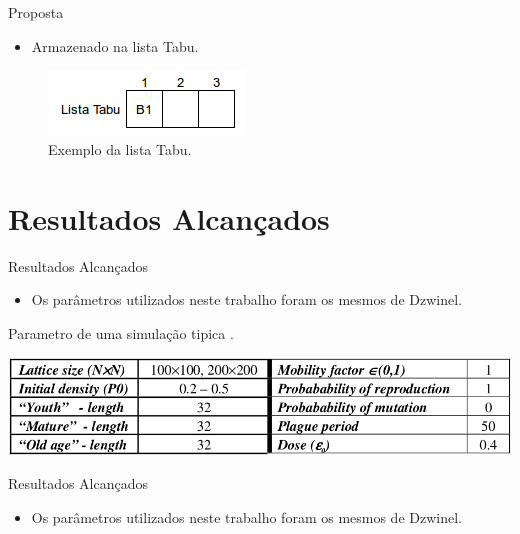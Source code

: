 \documentclass{beamer}
\begin{document}
\begin{frame}{Proposta}
	\begin{itemize}
		\item Armazenado na lista Tabu.
	\end{itemize}
\begin{figure}[h!]
\centering
\includegraphics[width=.5\textwidth]{../artigo/imagens/lista-tabu}
\caption{Exemplo da lista Tabu.}
\label{fig:busca-tabu}
\end{figure}
\end{frame}

\section{Resultados Alcançados}
\begin{frame}{Resultados Alcançados}
	\begin{itemize}
		\item Os parâmetros utilizados neste trabalho foram os mesmos de
		Dzwinel.
	\end{itemize}
\begin{table}[ht]
\centering
\caption{Parametro de uma simulação tipica \cite{dzwinel:04}.}
\label{tab:parametro-simulacao}
\includegraphics[width=.7\textwidth]{../artigo/imagens/parametro-simulacao}
\end{table}
\end{frame}

\begin{frame}{Resultados Alcançados}
	\begin{itemize}
		\item Os parâmetros utilizados neste trabalho foram os mesmos de
		Dzwinel.
	\end{itemize}
\end{frame}

\end{document}
